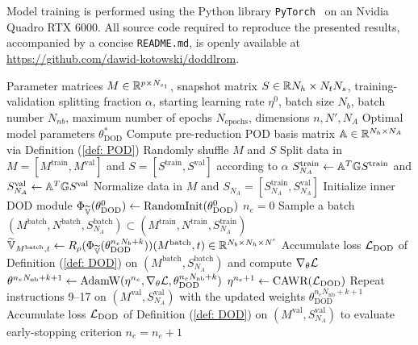 Model training is performed using the Python library \texttt{PyTorch}~\cite{pytorch2019} on
an Nvidia Quadro RTX 6000. 
All source code required to reproduce the presented results, accompanied by a concise 
\texttt{README.md}, is openly available at 
\url{https://github.com/dawid-kotowski/doddlrom}.


\begin{algorithm}[p]
    \caption{DOD training algorithm (offline)}
    \label{alg: inner-dod training}
    \begin{algorithmic}[1]
    \Require Parameter matrices $M \in \mathbb{R}^{p\times N_{s_1}}$,
    snapshot matrix $S \in \mathbb{R}{N_h \times N_t N_s}$, 
    training-validation splitting fraction $\alpha$, starting learning rate $\eta^0$, 
    batch size $N_b$, batch number $N_{nb}$, maximum number of epochs $N_{\text{epochs}}$, dimensions $n, N', N_A$
    \Ensure Optimal model parameters $\theta_\text{DOD}^*$
    \State Compute pre-reduction POD basis matrix $\mathbb{A} \in \mathbb{R}^{N_h \times N_A}$ via Definition
    (\ref{def: POD})
    \State Randomly shuffle $M$ and $S$
    \State Split data in $M = [M^{\text{train}}, M^{\text{val}}]$ and 
    $S = [S^{\text{train}}, S^{\text{val}}]$ according to $\alpha$
    \State $S_{N_A}^\text{train} \gets \mathbb{A}^T \mathbb{G} S^\text{train}$ and $S_{N_A}^\text{val} \gets \mathbb{A}^T \mathbb{G} S^\text{val}$
    \State Normalize data in $M$ and $S_{N_A} = [S_{N_A}^{\text{train}}, S_{N_A}^{\text{val}}]$
    \State Initialize inner DOD module $\Phi_{\widetilde{\mathbb{V}}}(\theta^0_\text{DOD}) \gets \text{RandomInit}(\theta^0_\text{DOD})$
    \State $n_e = 0$
        \State Sample a batch $(M^{\text{batch}}, N^{\text{batch}}, S_{N_A}^{\text{batch}}) \subset 
        (M^{\text{train}}, N^{\text{train}}, S_{N_A}^{\text{train}})$
            \State $\widetilde{\mathbb{V}}_{M^\text{batch}, t} \gets 
            R_\rho(\Phi_{\widetilde{\mathbb{V}}}(\theta^{n_e N_b + k}_\text{DOD}))(M^\text{batch}, t)
            \in \mathbb{R}^{N_b \times N_h \times N'}$
        \EndFor
        \State Accumulate loss $\mathcal{L}_\text{DOD}$ of Definition
        (\ref{def: DOD}) on $(M^{\text{batch}}, S_{N_A}^{\text{batch}})$ 
        and compute $\nabla_\theta \mathcal{L}$
        \State $\theta^{n_e N_{\text{nb}}+k+1} \gets 
        \text{AdamW}(\eta^{n_e}, \nabla_\theta \mathcal{L}, \theta_\text{DOD}^{n_e N_{\text{nb}}+k})$
        \State $\eta^{n_e + 1} \gets \text{CAWR}(\mathcal{L}_\text{DOD})$
      \EndFor
      \State Repeat instructions 9--17 on $(M^{\text{val}}, S_{N_A}^{\text{val}})$ 
      with the updated weights $\theta_\text{DOD}^{n_e N_{\text{nb}}+k+1}$
      \State Accumulate loss $\mathcal{L}_\text{DOD}$ of Definition
        (\ref{def: DOD}) on $(M^{\text{val}}, S_{N_A}^{\text{val}})$ 
      to evaluate early-stopping criterion
      \State $n_e = n_e + 1$
    \EndWhile
    \end{algorithmic}
    \end{algorithm}




